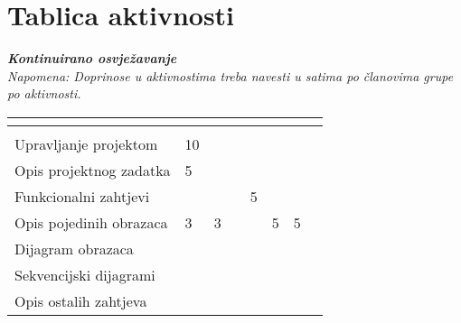 \begin{packed_enum}
			
		\end{packed_enum}
		
		\eject
		\section*{Tablica aktivnosti}
		
			\textbf{\textit{Kontinuirano osvježavanje}}\\
			
			 \textit{Napomena: Doprinose u aktivnostima treba navesti u satima po članovima grupe po aktivnosti.}
					
						
			
			\begin{longtabu} to \textwidth {|X[7, l]|X[1, c]|X[1, c]|X[1, c]|X[1, c]|X[1, c]|X[1, c]|X[1, c]|}
								
				  &      &  &	 &	 &
				 &
				 &	 \\ \hline 
				\endfirsthead
				
			
				  &      &  &	 &
				 &	 &
				 &	 \\ \hline 
				\endhead
				
				
				\endfoot
							
				 
				\endlastfoot
				
				Upravljanje projektom 	     & 10 &  &  &  &  &  & \\ \hline
				Opis projektnog zadatka 	 & 5 &  &  &  &  &  & \\ \hline
				
				Funkcionalni zahtjevi       &  &  &  & 5 &  &  &  \\ \hline
				Opis pojedinih obrazaca 	& 3 & 3 &  &  & 5 & 5 &  \\ \hline
				Dijagram obrazaca 			&  &  &  &  &  &  &  \\ \hline
				Sekvencijski dijagrami 		&  &  &  &  &  &  &  \\ \hline
				Opis ostalih zahtjeva 		&  &  &  &  &  &  &  \\ \hline


\end{longtabu}
